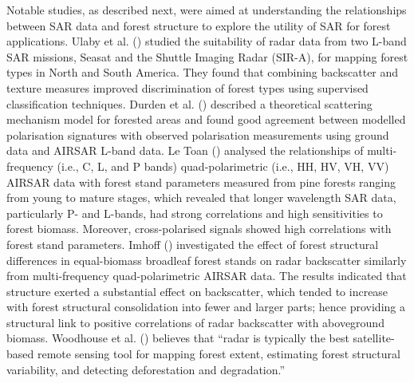 Notable studies, as described next, were aimed at understanding the relationships between SAR data and forest structure to explore the utility of SAR for forest applications. Ulaby et al. (\citeyearpar{ulaby_textural_1986}) studied the suitability of radar data from two L-band SAR missions, Seasat and the Shuttle Imaging Radar (SIR-A), for mapping forest types in North and South America. They found that combining backscatter and texture measures improved discrimination of forest types using supervised classification techniques. Durden et al. (\citeyearpar{durden_modeling_1989}) described a theoretical scattering mechanism model for forested areas and found good agreement between modelled polarisation signatures with observed polarisation measurements using ground data and AIRSAR L-band data. Le Toan (\citeyearpar{le_toan_relating_1992}) analysed the relationships of multi-frequency (i.e., C, L, and P bands) quad-polarimetric (i.e., HH, HV, VH, VV) AIRSAR data with forest stand parameters measured from pine forests ranging from young to mature stages, which revealed that longer wavelength SAR data, particularly P- and L-bands, had strong correlations and high sensitivities to forest biomass. Moreover, cross-polarised signals showed high correlations with forest stand parameters. Imhoff (\citeyearpar{imhoff_theoretical_1995}) investigated the effect of forest structural differences in equal-biomass broadleaf forest stands on radar backscatter similarly from multi-frequency quad-polarimetric AIRSAR data. The results indicated that structure exerted a substantial effect on backscatter, which tended to increase with forest structural consolidation into fewer and larger parts; hence providing a structural link to positive correlations of radar backscatter with aboveground biomass. Woodhouse et al. (\citeyearpar{woodhouse_radar_2012}) believes that \enquote{radar is typically the best satellite-based remote sensing tool for mapping forest extent, estimating forest structural variability, and detecting deforestation and degradation.}

